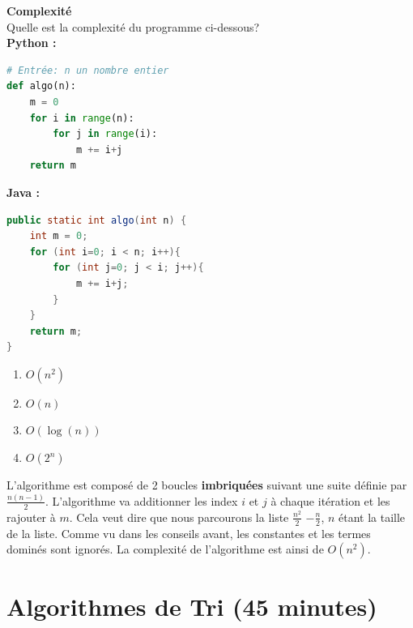 \begin{Exercice}[10 minutes] \textbf{Complexité \optionnel} \\
    Quelle est la complexité du programme ci-dessous?\\
        \textbf{Python :}
        \begin{lstlisting}[language=Python]
# Entrée: n un nombre entier
def algo(n):
    m = 0
    for i in range(n):
        for j in range(i):
            m += i+j
    return m
        \end{lstlisting}
        
        \textbf{Java :}
        \begin{lstlisting}[language=Java]
public static int algo(int n) {
    int m = 0;
    for (int i=0; i < n; i++){
        for (int j=0; j < i; j++){
            m += i+j;
        }
    }
    return m;
}
        \end{lstlisting}
    
        \begin{enumerate}
            \item $O(n^2)$
            \item $O(n)$
            \item $O(\log(n))$
            \item $O(2^n)$
        \end{enumerate}

    \begin{solution} 
    L'algorithme est composé de 2 boucles \textbf{imbriquées} suivant une suite définie par $\frac{n(n-1)}{2}$. L'algorithme va additionner les index $i$ et $j$ à chaque itération et les rajouter à $m$.
    Cela veut dire que nous parcourons la liste $\frac{n^{2}}{2}$ $- \frac{n}{2}$, $n$ étant la taille de la liste. Comme vu dans les conseils avant, les constantes et les termes dominés sont ignorés. La complexité de l'algorithme est ainsi de $O(n^2)$.
    \end{solution}
    
\end{Exercice}

\section{Algorithmes de Tri (45 minutes)}

